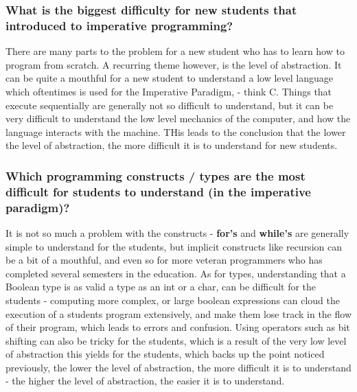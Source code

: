 \subsubsection{What is the biggest difficulty for new students that introduced to imperative programming?}

There are many parts to the problem for a new student who has to learn how to program from scratch. A recurring theme however, is the level of 
abstraction. It can be quite a mouthful for a new student to understand a low level language which oftentimes is used for the Imperative Paradigm, - 
think C. Things that execute sequentially are generally not so difficult to understand, but it can be very difficult to understand the low level 
mechanics of the computer, and how the language interacts with the machine. THis leads to the conclusion that the lower the level of abstraction, the 
more difficult it is to understand for new students.

\subsubsection{Which programming constructs / types are the most difficult for students to understand (in the imperative paradigm)?}

It is not so much a problem with the constructs - \textbf{for's} and \textbf{while's} are generally simple to understand for the students, but implicit 
constructs like recursion can be a bit of a mouthful, and even so for more veteran programmers who has completed several semesters in the education. As 
for types, understanding that a Boolean type is as valid a type as an int or a char, can be difficult for the students - computing more complex, or 
large boolean expressions can cloud the execution of a students program extensively, and make them lose track in the flow of their program, which leads 
to errors and confusion. Using operators such as bit shifting can also be tricky for the students, which is a result of the very low level of 
abstraction this yields for the students, which backs up the point noticed previously, the lower the level of abstraction, the more difficult it is to 
understand - the higher the level of abstraction, the easier it is to understand.